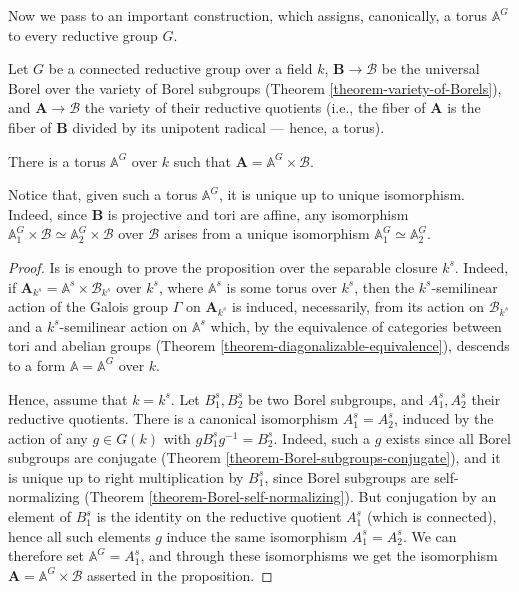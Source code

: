 Now we pass to an important construction, which assigns, canonically, a torus $\mathbb A^G$ to every reductive group $G$. 

\begin{proposition}
 \label{proposition-universal-Cartan}
Let $G$ be a connected reductive group over a field $k$, $\mathbf B\to \mathcal B$ be the universal Borel over the variety of Borel subgroups (Theorem \ref{theorem-variety-of-Borels}), and $\mathbf A\to \mathcal B$ the variety of their reductive quotients (i.e., the fiber of $\mathbf A$ is the fiber of $\mathbf B$ divided by its unipotent radical --- hence, a torus). 

There is a torus $\mathbb A^G$ over $k$ such that $\mathbf A = \mathbb A^G\times \mathcal B $.
\end{proposition}

Notice that, given such a torus $\mathbb A^G$, it is unique up to unique isomorphism. Indeed, since $\mathbf B$ is projective and tori are affine, any isomorphism $\mathbb A_1^G \times \mathcal B \simeq \mathbb A_2^G \times \mathcal B$ over $\mathcal B$ arises from a unique isomorphism $\mathbb A_1^G \simeq \mathbb A_2^G$.

\begin{proof}
Is is enough to prove the proposition over the separable closure $k^s$. Indeed, if $\mathbf A_{k^s} = \mathbb A^s\times \mathcal B_{k^s} $ over $k^s$, where $\mathbb A^s$ is some torus over $k^s$, then the $k^s$-semilinear action of the Galois group $\Gamma$ on $\mathbf A_{k^s}$ is induced, necessarily, from its action on $\mathcal B_{k^s} $  and a $k^s$-semilinear action on $\mathbb A^s$ which, by the equivalence of categories between tori and abelian groups (Theorem \ref{theorem-diagonalizable-equivalence}), descends to a form $\mathbb A = \mathbb A^G$ over $k$.

Hence, assume that $k=k^s$. Let $B^s_1, B^s_2$ be two Borel subgroups, and $A_1^s, A_2^s$ their reductive quotients. There is a canonical isomorphism $A_1^s=A_2^s$, induced by the action of any $g\in G(k)$ with $g B^s_1 g^{-1} = B^s_2$. Indeed, such a $g$ exists since all Borel subgroups are conjugate (Theorem \ref{theorem-Borel-subgroups-conjugate}), and it is unique up to right multiplication by $B^s_1$, since Borel subgroups are self-normalizing (Theorem \ref{theorem-Borel-self-normalizing}). But conjugation by an element of $B^s_1$ is the identity on the reductive quotient $A^s_1$ (which is connected), hence all such elements $g$ induce the same isomorphism $A_1^s=A_2^s$. We can therefore set $\mathbb A^G = A_1^s$, and through these isomorphisms we get the isomorphism $\mathbf A = \mathbb A^G\times \mathcal B $ asserted in the proposition.
\end{proof}

